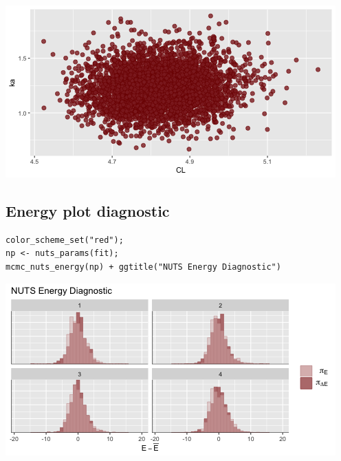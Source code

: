 \documentclass[11pt]{article}
\begin{document}
\begin{center}
\includegraphics[width=.9\linewidth]{result/scatter.png}
\end{center}

\subsection{Energy  plot diagnostic}
\label{sec:org2d6111e}
\begin{verbatim}
color_scheme_set("red");
np <- nuts_params(fit);
mcmc_nuts_energy(np) + ggtitle("NUTS Energy Diagnostic")
\end{verbatim}

\begin{center}
\includegraphics[width=.9\linewidth]{result/energy.png}
\end{center}
\end{document}
